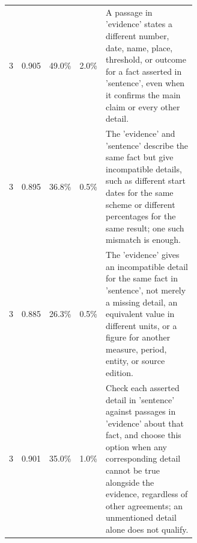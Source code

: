 \begin{tabular}{@{}rrrrp{0.62\linewidth}@{}}
3 & 0.905 & 49.0\% & 2.0\% & A passage in 'evidence' states a different number, date, name, place, threshold, or outcome for a fact asserted in 'sentence', even when it confirms the main claim or every other detail. \\
3 & 0.895 & 36.8\% & 0.5\% & The 'evidence' and 'sentence' describe the same fact but give incompatible details, such as different start dates for the same scheme or different percentages for the same result; one such mismatch is enough. \\
3 & 0.885 & 26.3\% & 0.5\% & The 'evidence' gives an incompatible detail for the same fact in 'sentence', not merely a missing detail, an equivalent value in different units, or a figure for another measure, period, entity, or source edition. \\
3 & 0.901 & 35.0\% & 1.0\% & Check each asserted detail in 'sentence' against passages in 'evidence' about that fact, and choose this option when any corresponding detail cannot be true alongside the evidence, regardless of other agreements; an unmentioned detail alone does not qualify. \\
\bottomrule
\end{tabular}
